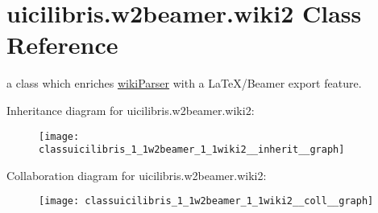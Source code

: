 \hypertarget{classuicilibris_1_1w2beamer_1_1wiki2}{\section{uicilibris.\-w2beamer.\-wiki2 \-Class \-Reference}
\label{classuicilibris_1_1w2beamer_1_1wiki2}
}


a class which enriches \hyperlink{namespaceuicilibris_1_1wikiParser}{wiki\-Parser} with a \-La\-Te\-X/\-Beamer export feature.  




\-Inheritance diagram for uicilibris.\-w2beamer.\-wiki2\-:
\nopagebreak
\begin{figure}[H]
\begin{center}
\leavevmode
\texttt{[image: classuicilibris\_1\_1w2beamer\_1\_1wiki2\_\_inherit\_\_graph]}
\end{center}
\end{figure}


\-Collaboration diagram for uicilibris.\-w2beamer.\-wiki2\-:
\nopagebreak
\begin{figure}[H]
\begin{center}
\leavevmode
\texttt{[image: classuicilibris\_1\_1w2beamer\_1\_1wiki2\_\_coll\_\_graph]}
\end{center}
\end{figure}
